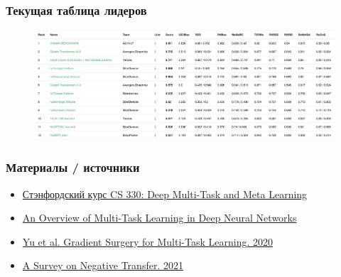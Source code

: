 \documentclass[aspectratio=169]{beamer}
\begin{document}
\begin{frame}
	\frametitle{Текущая таблица лидеров}
	\begin{figure}
	    \includegraphics[width=1\textwidth]{assets/rsg_lb.png}
	\end{figure}
\end{frame}

\begin{frame}
	\frametitle{Материалы / источники}
	\begin{itemize}
		\item \href{https://cs330.stanford.edu/}{\color {blue} Стэнфордский курс CS 330: Deep Multi-Task and Meta Learning}
		\item \href{https://ruder.io/multi-task/}{\color {blue} An Overview of Multi-Task Learning in Deep Neural Networks}
		\item \href{https://arxiv.org/abs/2001.06782}{\color {blue} Yu et al. Gradient Surgery for Multi-Task Learning. 2020}
		\item \href{https://arxiv.org/abs/2009.00909}{\color {blue} A Survey on Negative Transfer. 2021}
	\end{itemize}
\end{frame}
\end{document}
